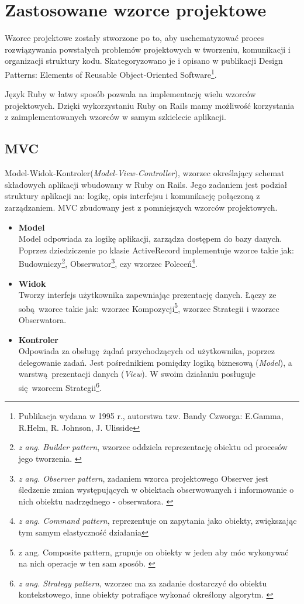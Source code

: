 \section{Zastosowane wzorce projektowe}
\label{sec:patterns}
Wzorce projektowe zostały stworzone po to, aby uschematyzować proces rozwiązywania powstałych problemów projektowych w tworzeniu, komunikacji i organizacji struktury kodu. Skategoryzowano je i opisano w publikacji Design Patterns: Elements of Reusable Object-Oriented Software\footnote{Publikacja wydana w 1995 r., autorstwa tzw. Bandy Czworga: E.Gamma, R.Helm, R. Johnson, J. Ulisside}.

Język Ruby w łatwy sposób pozwala na implementację wielu wzorców projektowych. Dzięki wykorzystaniu Ruby on Rails mamy możliwość korzystania z zaimplementowanych wzorców w samym szkielecie aplikacji.
  \subsection{MVC}
   Model-Widok-Kontroler(\emph{Model-View-Controller}), wzorzec określający schemat składowych aplikacji wbudowany w Ruby on Rails. Jego zadaniem jest podział struktury aplikacji na: logikę, opis interfejsu i komunikację połączoną z zarządzaniem.
   MVC zbudowany jest z pomniejszych wzorców projektowych.
    \begin{itemize}
      \item \textbf {Model} \\
      Model odpowiada za logikę aplikacji, zarządza dostępem do bazy danych.
      Poprzez dziedziczenie po klasie ActiveRecord implementuje wzorce takie jak: Budowniczy\footnote{\emph{z ang. Builder pattern}, wzorzec oddziela reprezentację obiektu od procesów jego tworzenia. \cite{ruby_patterns}}, Obserwator\footnote{\emph{z ang. Observer pattern}, zadaniem wzorca projektowego Observer jest śledzenie zmian występujących w obiektach obserwowanych i informowanie o nich obiektu nadrzędnego - obserwatora. \cite{ruby_patterns}}, czy wzorzec Poleceń\footnote{\emph{z ang. Command pattern}, reprezentuje on zapytania jako obiekty, zwiększając tym samym elastyczność działania\cite{ruby_patterns}}.

      \item \textbf {Widok} \\
      Tworzy interfejs użytkownika zapewniając prezentację danych. Łączy ze sobą wzorce takie jak: wzorzec Kompozycji\footnote{z ang. Composite pattern, grupuje on obiekty w jeden aby móc wykonywać na nich operacje w ten sam sposób. \cite{ruby_patterns}}, wzorzec Strategii i wzorzec Obserwatora.

      \item \textbf {Kontroler} \\
      Odpowiada za obsługę żądań przychodzących od użytkownika, poprzez delegowanie zadań. Jest pośrednikiem pomiędzy logiką biznesową (\emph{Model}), a warstwą prezentacji danych (\emph{View}). W swoim działaniu posługuje się wzorcem Strategii\footnote{ \emph{z ang. Strategy pattern}, wzorzec ma za zadanie dostarczyć do obiektu kontekstowego, inne obiekty potrafiące wykonać określony algorytm. \cite{ruby_patterns}}.
    \end{itemize}

